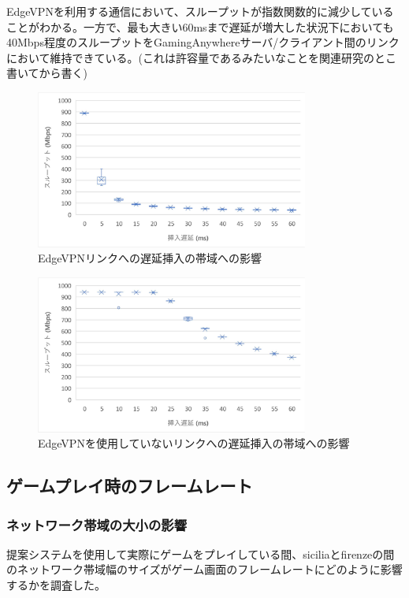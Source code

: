 EdgeVPNを利用する通信において、スループットが指数関数的に減少していることがわかる。一方で、最も大きい60msまで遅延が増大した状況下においても40Mbps程度のスループットをGamingAnywhereサーバ/クライアント間のリンクにおいて維持できている。(これは許容量であるみたいなことを関連研究のとこ書いてから書く)

\begin{figure}[t]
    \centering
    \includegraphics[width=0.8\textwidth,keepaspectratio,clip]{img/bandwidth_withEdgeVPN.pdf}
    \caption{EdgeVPNリンクへの遅延挿入の帯域への影響}
    \label{fig:band_with_edge}
\end{figure}

\begin{figure}[t]
    \centering
    \includegraphics[width=0.8\textwidth,keepaspectratio,clip]{img/bandwidth_withoutEdgeVPN.pdf}
    \caption{EdgeVPNを使用していないリンクへの遅延挿入の帯域への影響}
    \label{fig:band_without_edge}
\end{figure}

\subsection{ゲームプレイ時のフレームレート}

\subsubsection{ネットワーク帯域の大小の影響}
提案システムを使用して実際にゲームをプレイしている間、siciliaとfirenzeの間のネットワーク帯域幅のサイズがゲーム画面のフレームレートにどのように影響するかを調査した。

